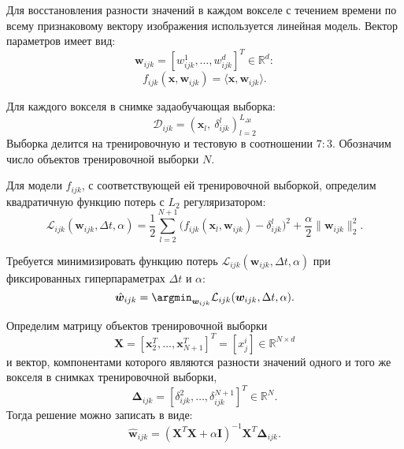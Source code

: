 \documentclass[12pt,twoside]{article}
\begin{document}
Для восстановления разности значений в каждом вокселе с течением времени по всему признаковому вектору изображения используется линейная модель. Вектор параметров имеет вид:
\[ \bm{w}_{ijk} = [w_{ijk}^1, \ldots, w_{ijk}^{d}]^{T} \in \mathbb{R}^{d}: \]
\begin{equation}
	\label{f_ijk}
	f_{ijk}(\bm{x}, \bm{w}_{ijk}) = \langle \bm{x}, \bm{w}_{ijk} \rangle.
\end{equation}

Для каждого вокселя в снимке задаобучающая выборка:
\begin{equation}
    \mathcal{D}_{ijk} = \left(\bm{x}_l,~\delta^{l}_{ijk} \right)^{ L_{\Delta t}}_{l = 2}
\end{equation}
Выборка делится на тренировочную и тестовую в соотношении $7 : 3$. 
Обозначим число объектов тренировочной выборки $N$.

Для модели $f_{ijk}$, с соответствующей ей тренировочной выборкой,
определим квадратичную функцию потерь с $L_2$ регуляризатором:
\begin{equation}
	\label{Loss}
	\mathcal{L}_{ijk}(\bm{w}_{ijk}, \Delta t, \alpha) = \frac{1}{2} \sum\limits_{l = 2}^{N+1} \big(f_{ijk}(\bm{x}_l, \bm{w}_{ijk}) - \delta^{l}_{ijk}\big)^2 + \frac{\alpha}{2} \|\bm{w}_{ijk}\|^2_2.
\end{equation}

Требуется минимизировать функцию потерь $\mathcal{L}_{ijk}(\bm{w}_{ijk}, \Delta t, \alpha)$ при фиксированных гиперпараметрах $\Delta t$ и $\alpha$:
\begin{equation}
	\label{main_Problem}
	\hat{\bm{w}}_{ijk} = \argmin_{\bm{w}_{ijk}} \mathcal{L}_{ijk}(\bm{w}_{ijk}, \Delta t, \alpha).
\end{equation}

Определим матрицу объектов тренировочной выборки
\begin{equation}
\label{X}
    \bm{X} = [\bm{x}_2^T, \dots, \bm{x}_{N+1}^T]^T = [x^i_j] \in \mathbb{R}^{N \times d}
\end{equation}
и вектор, компонентами которого являются разности значений одного и того же вокселя в снимках тренировочной выборки,
\begin{equation}
\label{Delta}
    \bm{\Delta}_{ijk} = [\delta^{2}_{ijk}, \dots, \delta^{N+1}_{ijk}]^T \in \mathbb{R}^{N}.
\end{equation}
Тогда решение можно записать в виде:
\begin{equation}
\label{weights}
    \hat{\bm{w}}_{ijk} = (\bm{X}^T \bm{X} + \alpha \mathbf{I})^{-1} \bm{X}^T \mathbf{\Delta}_{ijk}.
\end{equation}
\end{document}
